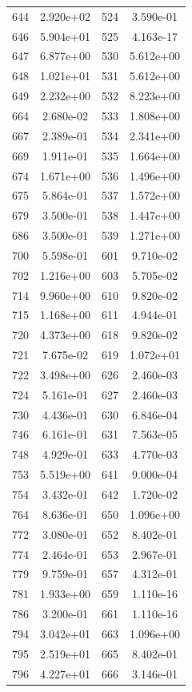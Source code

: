 \documentclass[12pt]{article}
\begin{document}
\begin{longtable}{@{}cccc@{}}
644 & 2.920e+02 & 524 & 3.590e-01 \\
646 & 5.904e+01 & 525 & 4.163e-17 \\
647 & 6.877e+00 & 530 & 5.612e+00 \\
648 & 1.021e+01 & 531 & 5.612e+00 \\
649 & 2.232e+00 & 532 & 8.223e+00 \\
664 & 2.680e-02 & 533 & 1.808e+00 \\
667 & 2.389e-01 & 534 & 2.341e+00 \\
669 & 1.911e-01 & 535 & 1.664e+00 \\
674 & 1.671e+00 & 536 & 1.496e+00 \\
675 & 5.864e-01 & 537 & 1.572e+00 \\
679 & 3.500e-01 & 538 & 1.447e+00 \\
686 & 3.500e-01 & 539 & 1.271e+00 \\
700 & 5.598e-01 & 601 & 9.710e-02 \\
702 & 1.216e+00 & 603 & 5.705e-02 \\
714 & 9.960e+00 & 610 & 9.820e-02 \\
715 & 1.168e+00 & 611 & 4.944e-01 \\
720 & 4.373e+00 & 618 & 9.820e-02 \\
721 & 7.675e-02 & 619 & 1.072e+01 \\
722 & 3.498e+00 & 626 & 2.460e-03 \\
724 & 5.161e-01 & 627 & 2.460e-03 \\
730 & 4.436e-01 & 630 & 6.846e-04 \\
746 & 6.161e-01 & 631 & 7.563e-05 \\
748 & 4.929e-01 & 633 & 4.770e-03 \\
753 & 5.519e+00 & 641 & 9.000e-04 \\
754 & 3.432e-01 & 642 & 1.720e-02 \\
764 & 8.636e-01 & 650 & 1.096e+00 \\
772 & 3.080e-01 & 652 & 8.402e-01 \\
774 & 2.464e-01 & 653 & 2.967e-01 \\
779 & 9.759e-01 & 657 & 4.312e-01 \\
781 & 1.933e+00 & 659 & 1.110e-16 \\
786 & 3.200e-01 & 661 & 1.110e-16 \\
794 & 3.042e+01 & 663 & 1.096e+00 \\
795 & 2.519e+01 & 665 & 8.402e-01 \\
796 & 4.227e+01 & 666 & 3.146e-01 \\

\end{longtable}
\end{document}

